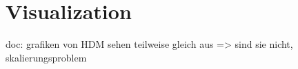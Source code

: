 \section{Visualization}

doc: grafiken von HDM sehen teilweise gleich aus => sind sie nicht, skalierungsproblem